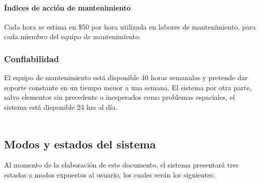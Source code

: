 \documentclass[a4paper]{article}
\newcommand\tab[1][0.55cm]{\hspace*{#1}}
\begin{document}
{    \paragraph{Índices de acción de mantenimiento} Cada hora se estima en \$50 por hora utilizada en labores de mantenimiento, para cada miembro del equipo de mantenimiento. 

\subsubsection{Confiabilidad}

	\tab El equipo de mantenimiento está disponible 40 horas semanales y pretende dar soporte constante en un tiempo menor a una semana. El sistema por otra parte, salvo elementos sin precedente o inesperados como problemas espaciales, el sistema está disponible 24 hrs al día. \\ \\

\color{Blue}
\subsection{Modos y estados del sistema}
\color{black}
\justify  %

	\tab Al momento de la elaboración de este documento, el sistema presentará tres estados o modos expuestos al usuario, los cuales serán los siguientes: \\
    
    
    
}
\end{document}
